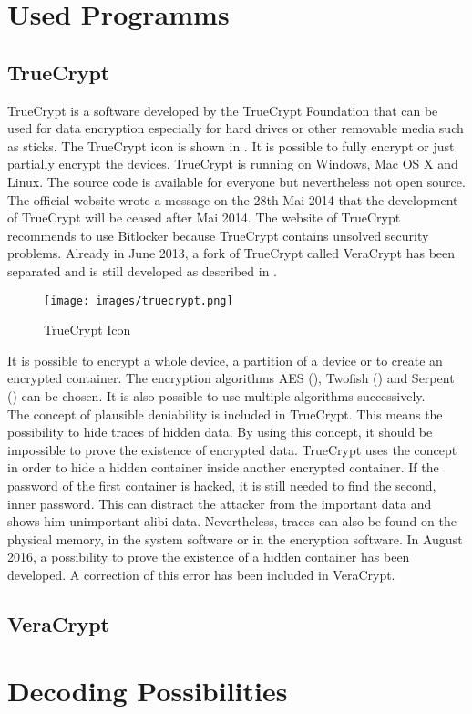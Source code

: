 

\section{Used Programms}


\subsection{TrueCrypt}
TrueCrypt is a software developed by the TrueCrypt Foundation that can be used for data encryption especially for hard drives or other removable media such as sticks. The TrueCrypt icon is shown in . It is possible to fully encrypt or just partially encrypt the devices. TrueCrypt is running on Windows, Mac OS X and Linux. The source code is available for everyone but nevertheless not open source. The official website wrote a message on the 28th Mai 2014 that the development of TrueCrypt will be ceased after Mai 2014. 
The website of TrueCrypt recommends to use Bitlocker because TrueCrypt contains unsolved security problems. 
Already in June 2013, a fork of TrueCrypt called VeraCrypt has been separated and is still developed as described in . \\

\begin{figure}[h!]
	\centering
	\texttt{[image: images/truecrypt.png]}
	\caption{TrueCrypt Icon}
	\label{fig:truecrypt}
\end{figure}

It is possible to encrypt a whole device, a partition of a device or to create an encrypted container. The encryption algorithms AES (), Twofish () and Serpent () can be chosen. It is also possible to use multiple algorithms successively. \\

The concept of plausible deniability is included in TrueCrypt. This means the possibility to hide traces of hidden data. By using this concept, it should be impossible to prove the existence of encrypted data. TrueCrypt uses the concept in order to hide a hidden container inside another encrypted container. If the password of the first container is hacked, it is still needed to find the second, inner password. This can distract the attacker from the important data and shows him unimportant alibi data. Nevertheless, traces can also be found on the physical memory, in the system software or in the encryption software. In August 2016, a possibility to prove the existence of a hidden container has been developed. A correction of this error has been included in VeraCrypt. 








\subsection{VeraCrypt}
\label{sec:vera}

\section{Decoding Possibilities}
